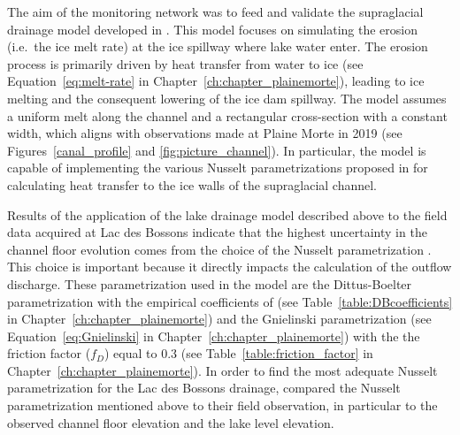 The aim of the monitoring network was to feed and validate the supraglacial drainage model developed in \cite{Vincent&al2010}. This model focuses on simulating the erosion (i.e.\ the ice melt rate) at the ice spillway where lake water enter. The erosion process is primarily driven by heat transfer from water to ice (see Equation~\ref{eq:melt-rate} in Chapter~\ref{ch:chapter_plainemorte}), leading to ice melting and the consequent lowering of the ice dam spillway. The model assumes a uniform melt along the channel and a rectangular cross-section with a constant width, which aligns with observations made at Plaine Morte in 2019 (see Figures~\ref{canal_profile} and \ref{fig:picture_channel}). In particular, the model is capable of implementing the various Nusselt parametrizations proposed in \cite{Clarke2003, Vincent&al2010, Ogier&al2021} for calculating heat transfer to the ice walls of the supraglacial channel. 


Results of the application of the lake drainage model described above to the field data acquired at Lac des Bossons indicate that the highest uncertainty in the channel floor evolution comes from the choice of the Nusselt parametrization \citep{Gagliardini&al2024}. This choice is important because it directly impacts the calculation of the outflow discharge. These parametrization used in the model are the Dittus-Boelter parametrization with the empirical coefficients of \cite{Clarke2003,Vincent&al2010,Ogier&al2021} (see Table~\ref{table:DBcoefficients} in Chapter~\ref{ch:chapter_plainemorte}) and the Gnielinski parametrization (see Equation~\ref{eq:Gnielinski} in Chapter~\ref{ch:chapter_plainemorte}) with the the friction factor ($f_D$) equal to 0.3 (see Table~\ref{table:friction_factor} in Chapter~\ref{ch:chapter_plainemorte}). In order to find the most adequate Nusselt parametrization for the Lac des Bossons drainage, \cite{Gagliardini&al2024} compared the Nusselt parametrization mentioned above to their field observation, in particular to the observed channel floor elevation and the lake level elevation. 

